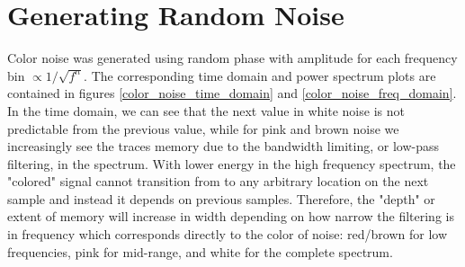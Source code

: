 \documentclass[10pt]{article}
\begin{document}
\section{Generating Random Noise}
Color noise was generated using random phase with amplitude for each frequency bin $\propto 1/\sqrt{f^n}$. The corresponding time domain and power spectrum plots are contained in figures \ref{color_noise_time_domain} and \ref{color_noise_freq_domain}. In the time domain, we can see that the next value in white noise is not predictable from the previous value, while for pink and brown noise we increasingly see the traces memory due to the bandwidth limiting, or low-pass filtering, in the spectrum. With lower energy in the high frequency spectrum, the "colored" signal cannot transition from to any arbitrary location on the next sample and instead it depends on previous samples. Therefore, the "depth" or extent of memory will increase in width depending on how narrow the filtering is in frequency which corresponds directly to the color of noise: red/brown for low frequencies, pink for mid-range, and white for the complete spectrum.
\end{document}
